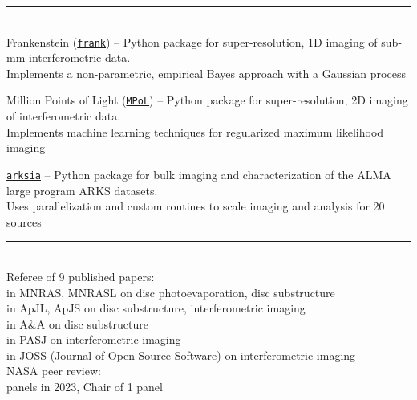 \documentclass[10pt,preprint]{aastex}
\newcommand{\jj}[1]{\textcolor{red}{#1}}
\newcommand*{\xdash}[1][3em]{\rule[0.5ex]{#1}{0.7pt}}
\begin{document}
 \xdash[98.5ex] \\
\noindent Frankenstein (\href{https://discsim.github.io/frank/}{\tt frank}) -- Python package for super-resolution, 1D imaging of sub-mm interferometric data. \\ \-\hspace{3.65cm}Implements a non-parametric, empirical Bayes approach with a Gaussian process

\noindent Million Points of Light (\href{https://mpol-dev.github.io/MPoL/index.html}{\tt MPoL}) -- Python package for super-resolution, 2D imaging of interferometric data. \\ \-\hspace{3.65cm}Implements machine learning techniques for regularized maximum likelihood imaging

\noindent \href{https://github.com/jeffjennings/arksia/}{\tt arksia} -- Python package for bulk imaging and characterization of the ALMA large program ARKS datasets. \\ \-\hspace{3.65cm}Uses parallelization and custom routines to scale imaging and analysis for 20 sources

 \xdash[95ex] \\
\noindent Referee of 9 published papers: \\
 in MNRAS, MNRASL on disc photoevaporation, disc substructure \\
 in ApJL, ApJS on disc substructure, interferometric imaging \\
 in A\&A on disc substructure \\
 in PASJ on interferometric imaging \\
 in JOSS (Journal of Open Source Software) on interferometric imaging \\
\noindent NASA peer review: \\
 panels in 2023, Chair of 1 panel
\end{document}
